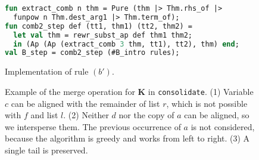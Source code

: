\begin{figure}[t]
\begin{lstlisting}[language=ML]
fun extract_comb n thm = Pure (thm |> Thm.rhs_of |>
  funpow n Thm.dest_arg1 |> Thm.term_of);
fun comb2_step def (tt1, thm1) (tt2, thm2) =
  let val thm = rewr_subst_ap def thm1 thm2;
  in (Ap (Ap (extract_comb 3 thm, tt1), tt2), thm) end;
val B_step = comb2_step (#B_intro rules);
\end{lstlisting}
\caption{Implementation of rule $(b')$.}
\label{fig:b-impl}
\end{figure}



\begin{figure}[t]\centering
{}
\caption{Example of the merge operation for $\mathbf{K}$ in \texttt{consolidate}.
(1) Variable $c$ can be aligned with the remainder of list $r$, which is not
possible with $f$ and list $l$.
(2) Neither $d$ nor the copy of $a$ can be aligned, so we intersperse them.
The previous occurrence of $a$ is not considered, because the algorithm is greedy
and works from left to right.
(3) A single tail is preserved.}
\label{fig:consolidate-merge}
\end{figure}


